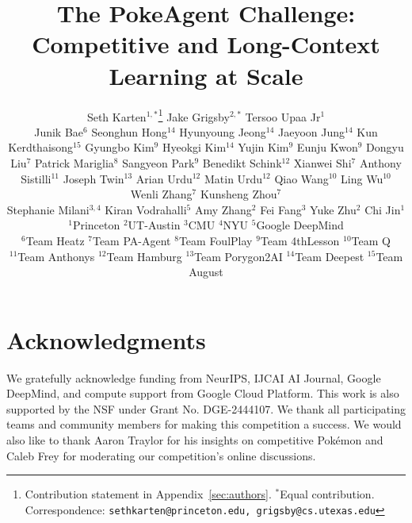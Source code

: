 \documentclass{article}
\title{The PokeAgent Challenge: \\ Competitive and Long-Context Learning at Scale}
\author{%
  Seth Karten$^{1,*}$\thanks{Contribution statement in Appendix~\ref{sec:authors}. $^{*}$Equal contribution. Correspondence: \texttt{sethkarten@princeton.edu, grigsby@cs.utexas.edu}} \quad
  Jake Grigsby$^{2,*}$ \quad
  Tersoo Upaa Jr$^{1}$
  \AND
  \parbox{0.95\textwidth}{\centering
  Junik Bae$^{6}$ \quad
  Seonghun Hong$^{14}$ \quad
  Hyunyoung Jeong$^{14}$ \quad
  Jaeyoon Jung$^{14}$ \quad
  Kun Kerdthaisong$^{15}$ \quad
  Gyungbo Kim$^{9}$ \quad
  Hyeokgi Kim$^{14}$ \quad
  Yujin Kim$^{9}$ \quad
  Eunju Kwon$^{9}$ \quad
  Dongyu Liu$^{7}$ \quad
  Patrick Mariglia$^{8}$ \quad
  Sangyeon Park$^{9}$ \quad
  Benedikt Schink$^{12}$ \quad
  Xianwei Shi$^{7}$ \quad
  Anthony Sistilli$^{11}$ \quad
  Joseph Twin$^{13}$ \quad
  Arian Urdu$^{12}$ \quad
  Matin Urdu$^{12}$ \quad
  Qiao Wang$^{10}$ \quad
  Ling Wu$^{10}$ \quad
  Wenli Zhang$^{7}$ \quad
  Kunsheng Zhou$^{7}$ \\[4pt]
  Stephanie Milani$^{3,4}$ \enspace
  Kiran Vodrahalli$^{5}$ \enspace
  Amy Zhang$^{2}$ \enspace
  Fei Fang$^{3}$ \enspace
  Yuke Zhu$^{2}$ \enspace
  Chi Jin$^{1}$}
  \AND
  \parbox{0.95\textwidth}{\centering\mdseries\small
  $^{1}$Princeton \quad $^{2}$UT-Austin \quad $^{3}$CMU \quad $^{4}$NYU \quad $^{5}$Google DeepMind \\
  $^{6}$Team Heatz \quad $^{7}$Team PA-Agent \quad $^{8}$Team FoulPlay \quad $^{9}$Team 4thLesson \quad $^{10}$Team Q \\
  $^{11}$Team Anthonys \quad $^{12}$Team Hamburg \quad $^{13}$Team Porygon2AI \quad $^{14}$Team Deepest \quad $^{15}$Team August %
  }
}
\begin{document}
\maketitle










\section*{Acknowledgments}
We gratefully acknowledge funding from NeurIPS, IJCAI AI Journal, Google DeepMind, and compute support from Google Cloud Platform. This work is also supported by the NSF under Grant No. DGE-2444107. We thank all participating teams and community members for making this competition a success. We would also like to thank Aaron Traylor for his insights on competitive Pokémon and Caleb Frey for moderating our competition's online discussions. 



\newpage
\appendix

\startcontents[appendix]
\newpage










\end{document}
